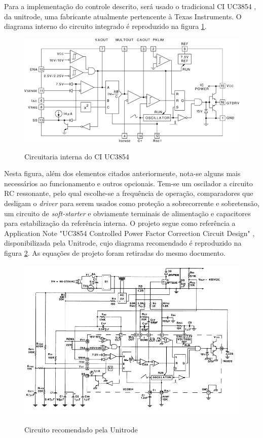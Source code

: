 \documentclass[
        12pt,
        openany, %
        oneside, %
        a4paper,			
        english,			
        brazil
        ]{abntbibufjf}
\begin{document}
Para a implementação do controle descrito, será usado o tradicional CI UC3854 \cite{uc3854}, da unitrode, uma fabricante atualmente pertencente à Texas Instruments. O diagrama interno do circuito integrado é reproduzido na figura \ref{uc}.

\begin{figure}[!h]
	\centering
	\caption{Circuitaria interna do CI UC3854}
	\includegraphics[scale=.7]{../RABISCOS/fbd_slus336a.png}\\
	\label{uc}
\end{figure}

Nesta figura, além dos elementos citados anteriormente, nota-se alguns mais necessários ao funcionamento e outros opcionais. Tem-se um oscilador a circuito RC ressonante, pelo qual escolhe-se a frequência de operação, comparadores que desligam o \textit{driver} para serem usados como proteção a sobrecorrente e sobretensão, um circuito de \textit{soft-starter} e obviamente terminais de alimentação e capacitores para estabilização da referência interna. O projeto segue como referência a Application Note "UC3854 Controlled Power Factor Correction Circuit Design" \cite{slua}, disponibilizada pela Unitrode, cujo diagrama recomendado é reproduzido na figura \ref{slua}. As equações de projeto foram retiradas do mesmo documento.

\begin{figure}[!h]
	\centering
	\caption{Circuito recomendado pela Unitrode}
	\includegraphics[scale=.7]{../RABISCOS/SLUA.png}\\
	\label{slua}
\end{figure}
\end{document}
